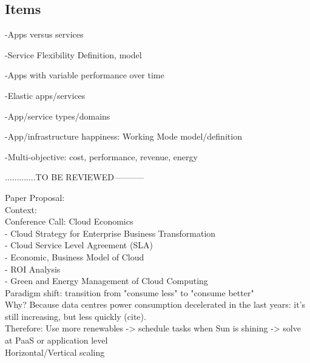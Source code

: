 \subsection{Items}
-Apps versus services

-Service Flexibility Definition, model

-Apps with variable performance over time

-Elastic apps/services

-App/service types/domains

-App/infrastructure happiness: Working Mode model/definition

-Multi-objective: cost, performance, revenue, energy

.............TO BE REVIEWED-----------



Paper Proposal: \\
Context: \\
  Conference Call: Cloud Economics \\
- Cloud Strategy for Enterprise Business Transformation \\
- Cloud Service Level Agreement (SLA) \\
- Economic, Business Model of Cloud \\
- ROI Analysis \\
- Green and Energy Management of Cloud Computing \\

Paradigm shift: transition from "consume less" to "consume better" \\
Why? Because data centres power consumption decelerated in the last years: it's still increasing, but less quickly (cite). \\

Therefore: Use more renewables -> schedule tasks when Sun is shining -> solve at PaaS or application level \\
Horizontal/Vertical scaling \\

